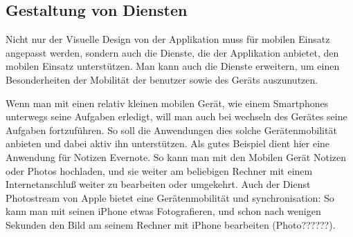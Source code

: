
\subsection{Gestaltung von Diensten}
\label{sub:gestaltung_von_diensten}

Nicht nur der Visuelle Design von der Applikation muss für mobilen Einsatz angepasst werden, sondern auch die Dienste, die der Applikation anbietet, den mobilen Einsatz unterstützen. Man kann auch die Dienste erweitern, um einen Besonderheiten der Mobilität der benutzer sowie des Geräts auszunutzen.

Wenn man mit einen relativ kleinen mobilen Gerät, wie einem Smartphones unterwegs seine Aufgaben erledigt, will man auch bei wechseln des Gerätes seine Aufgaben fortzuführen. So soll die Anwendungen dies solche Gerätenmobilität anbieten und dabei aktiv ihn unterstützen. Als gutes Beispiel dient hier eine Anwendung für Notizen Evernote. So kann man mit den Mobilen Gerät Notizen oder Photos hochladen, und sie weiter am beliebigen Rechner mit einem Internetanschluß weiter zu bearbeiten oder umgekehrt. Auch der Dienst Photostream von Apple bietet eine Gerätenmobilität und synchronisation: So kann man mit seinen iPhone etwas Fotografieren, und schon nach wenigen Sekunden den Bild am seinem Rechner mit iPhone bearbeiten (Photo??????). 










